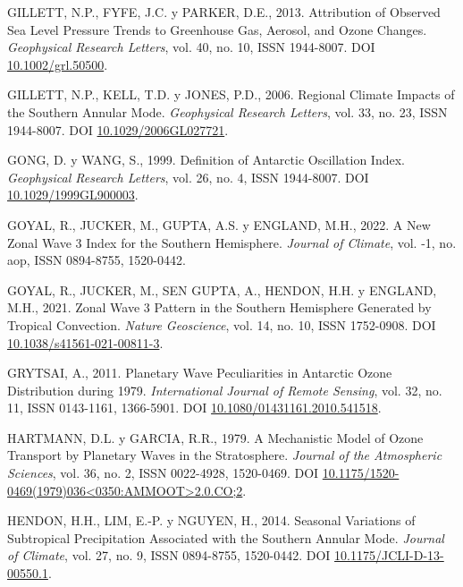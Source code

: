 \documentclass[12pt,oneside,a4paper]{reedthesis}
\newlength{\cslhangindent}
\newenvironment{CSLReferences}[2] %
 {%
  \setlength{\parindent}{0pt}
  \ifodd #1 \everypar{\setlength{\hangindent}{\cslhangindent}}\ignorespaces\fi
  \ifnum #2 > 0
  \setlength{\parskip}{#2\baselineskip}
  \fi
 }%
 {}
\begin{document}
\begin{CSLReferences}{1}{0}
\leavevmode{}%
GILLETT, N.P., FYFE, J.C. y PARKER, D.E., 2013. Attribution of Observed Sea Level Pressure Trends to Greenhouse Gas, Aerosol, and Ozone Changes. \emph{Geophysical Research Letters}, vol. 40, no. 10, ISSN 1944-8007. DOI \href{https://doi.org/10.1002/grl.50500}{10.1002/grl.50500}.

\leavevmode{}%
GILLETT, N.P., KELL, T.D. y JONES, P.D., 2006. Regional Climate Impacts of the {Southern Annular Mode}. \emph{Geophysical Research Letters}, vol. 33, no. 23, ISSN 1944-8007. DOI \href{https://doi.org/10.1029/2006GL027721}{10.1029/2006GL027721}.

\leavevmode{}%
GONG, D. y WANG, S., 1999. Definition of {Antarctic Oscillation} Index. \emph{Geophysical Research Letters}, vol. 26, no. 4, ISSN 1944-8007. DOI \href{https://doi.org/10.1029/1999GL900003}{10.1029/1999GL900003}.

\leavevmode{}%
GOYAL, R., JUCKER, M., GUPTA, A.S. y ENGLAND, M.H., 2022. A New Zonal Wave 3 Index for the {Southern Hemisphere}. \emph{Journal of Climate}, vol. -1, no. aop, ISSN 0894-8755, 1520-0442.

\leavevmode{}%
GOYAL, R., JUCKER, M., SEN GUPTA, A., HENDON, H.H. y ENGLAND, M.H., 2021. Zonal Wave 3 Pattern in the {Southern Hemisphere} Generated by Tropical Convection. \emph{Nature Geoscience}, vol. 14, no. 10, ISSN 1752-0908. DOI \href{https://doi.org/10.1038/s41561-021-00811-3}{10.1038/s41561-021-00811-3}.

\leavevmode{}%
GRYTSAI, A., 2011. Planetary Wave Peculiarities in {Antarctic} Ozone Distribution during 1979. \emph{International Journal of Remote Sensing}, vol. 32, no. 11, ISSN 0143-1161, 1366-5901. DOI \href{https://doi.org/10.1080/01431161.2010.541518}{10.1080/01431161.2010.541518}.

\leavevmode{}%
HARTMANN, D.L. y GARCIA, R.R., 1979. A {Mechanistic Model} of {Ozone Transport} by {Planetary Waves} in the {Stratosphere}. \emph{Journal of the Atmospheric Sciences}, vol. 36, no. 2, ISSN 0022-4928, 1520-0469. DOI \href{https://doi.org/10.1175/1520-0469(1979)036\%3C0350:AMMOOT\%3E2.0.CO;2}{10.1175/1520-0469(1979)036\textless0350:AMMOOT\textgreater2.0.CO;2}.

\leavevmode{}%
HENDON, H.H., LIM, E.-P. y NGUYEN, H., 2014. Seasonal {Variations} of {Subtropical Precipitation Associated} with the {Southern Annular Mode}. \emph{Journal of Climate}, vol. 27, no. 9, ISSN 0894-8755, 1520-0442. DOI \href{https://doi.org/10.1175/JCLI-D-13-00550.1}{10.1175/JCLI-D-13-00550.1}.


\end{CSLReferences}
\end{document}
